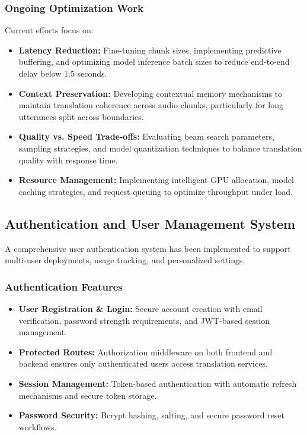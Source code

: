 \documentclass[12pt,oneside]{report}
\begin{document}
\subsubsection{Ongoing Optimization Work}

Current efforts focus on:
\begin{itemize}
    \item \textbf{Latency Reduction:} Fine-tuning chunk sizes, implementing predictive buffering, and optimizing model inference batch sizes to reduce end-to-end delay below 1.5 seconds.
    
    \item \textbf{Context Preservation:} Developing contextual memory mechanisms to maintain translation coherence across audio chunks, particularly for long utterances split across boundaries.
    
    \item \textbf{Quality vs. Speed Trade-offs:} Evaluating beam search parameters, sampling strategies, and model quantization techniques to balance translation quality with response time.
    
    \item \textbf{Resource Management:} Implementing intelligent GPU allocation, model caching strategies, and request queuing to optimize throughput under load.
\end{itemize}

\subsection{Authentication and User Management System}

A comprehensive user authentication system has been implemented to support multi-user deployments, usage tracking, and personalized settings.

\subsubsection{Authentication Features}

\begin{itemize}
    \item \textbf{User Registration \& Login:} Secure account creation with email verification, password strength requirements, and JWT-based session management.
    
    \item \textbf{Protected Routes:} Authorization middleware on both frontend and backend ensures only authenticated users access translation services.
    
    \item \textbf{Session Management:} Token-based authentication with automatic refresh mechanisms and secure token storage.
    
    \item \textbf{Password Security:} Bcrypt hashing, salting, and secure password reset workflows.
\end{itemize}
\end{document}
